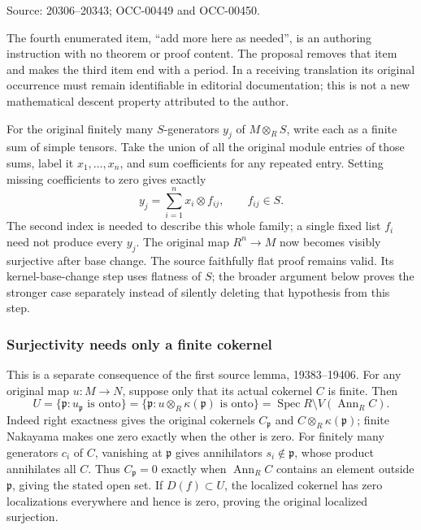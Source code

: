 Source: 20306--20343; OCC-00449 and OCC-00450.

The fourth enumerated item, ``add more here as needed'', is an authoring instruction with no theorem or proof content. The proposal removes that item and makes the third item end with a period. In a receiving translation its original occurrence must remain identifiable in editorial documentation; this is not a new mathematical descent property attributed to the author.

For the original finitely many \(S\)-generators \(y_j\) of \(M\otimes_RS\), write each as a finite sum of simple tensors. Take the union of all the original module entries of those sums, label it \(x_1,\ldots,x_n\), and sum coefficients for any repeated entry. Setting missing coefficients to zero gives exactly \[
y_j=\sum_{i=1}^n x_i\otimes f_{ij},\qquad f_{ij}\in S.
\] The second index is needed to describe this whole family; a single fixed list \(f_i\) need not produce every \(y_j\). The original map \(R^n\to M\) now becomes visibly surjective after base change. The source faithfully flat proof remains valid. Its kernel-base-change step uses flatness of \(S\); the broader argument below proves the stronger case separately instead of silently deleting that hypothesis from this step.

\subsubsection{Surjectivity needs only a finite cokernel}\label{surjectivity-needs-only-a-finite-cokernel}

This is a separate consequence of the first source lemma, 19383--19406. For any original map \(u:M\to N\), suppose only that its actual cokernel \(C\) is finite. Then \[
U=\{\mathfrak p:u_{\mathfrak p}\text{ is onto}\}
=\{\mathfrak p:u\otimes_R\kappa(\mathfrak p)\text{ is onto}\}
=\operatorname{Spec}R\setminus V(\operatorname{Ann}_RC).
\] Indeed right exactness gives the original cokernels \(C_{\mathfrak p}\) and \(C\otimes_R\kappa(\mathfrak p)\); finite Nakayama makes one zero exactly when the other is zero. For finitely many generators \(c_i\) of \(C\), vanishing at \(\mathfrak p\) gives annihilators \(s_i\notin\mathfrak p\), whose product annihilates all \(C\). Thus \(C_{\mathfrak p}=0\) exactly when \(\operatorname{Ann}_RC\) contains an element outside \(\mathfrak p\), giving the stated open set. If \(D(f)\subset U\), the localized cokernel has zero localizations everywhere and hence is zero, proving the original localized surjection.

